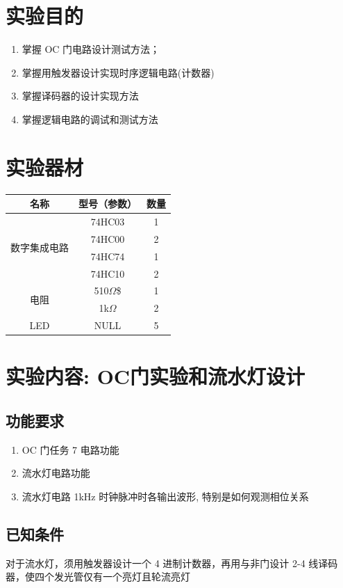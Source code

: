 \documentclass[a4paper,11pt,UTF8]{article}
\begin{document}
\tableofcontents\newpage
\section{实验目的}
\begin{enumerate}
	\item 掌握 OC 门电路设计测试方法；
	\item 掌握用触发器设计实现时序逻辑电路(计数器)
	\item 掌握译码器的设计实现方法
	\item 掌握逻辑电路的调试和测试方法
\end{enumerate}
\section{实验器材}
\begin{table}[!ht]
	\centering
	\begin{tabular}{|c|c|c|}
		\hline
		名称 & 型号（参数） & 数量 \\ \hline
		\multirow{4}{*}{数字集成电路} & 74HC03 & 1 \\  \cline{2-3}
		 & 74HC00 & 2 \\  \cline{2-3}e
		 & 74HC74 & 1 \\  \cline{2-3}
		 & 74HC10 & 2 \\  \hline
		\multirow{2}{*}{电阻} & 510$\Omega$\$ & 1 \\ \cline{2-3}
		 & 1k$\Omega$ & 2 \\  \cline{2-3}
		LED & NULL & 5 \\ \hline
	\end{tabular}
\end{table}
\section{实验内容: OC门实验和流水灯设计}
\subsection{功能要求}
\begin{enumerate}
	\item OC 门任务 7 电路功能
	\item 流水灯电路功能
	\item 流水灯电路 1kHz 时钟脉冲时各输出波形, 特别是如何观测相位关系
\end{enumerate}
\subsection{已知条件}
对于流水灯，须用触发器设计一个 4 进制计数器，再用与非门设计 2-4 线译码器，使四个发光管仅有一个亮灯且轮流亮灯
\end{document}

